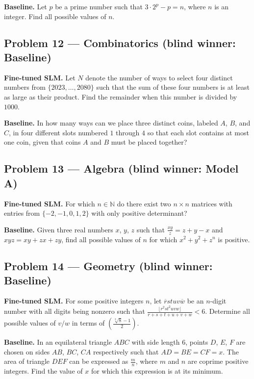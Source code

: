 \documentclass[11pt]{article}
\begin{document}
\medskip

\textbf{Baseline.} Let $p$ be a prime number such that $3 \cdot 2^p - p = n$, where $n$ is an integer. Find all possible values of $n$.

\subsection*{Problem 12 --- Combinatorics \quad (blind winner: Baseline)}

\textbf{Fine-tuned SLM.} Let $N$ denote the number of ways to select four distinct numbers from $\{2023,\dots,2080\}$ such that the sum of these four numbers is at least as large as their product. Find the remainder when this number is divided by $1000$.

\medskip

\textbf{Baseline.} In how many ways can we place three distinct coins, labeled $A$, $B$, and $C$, in four different slots numbered $1$ through $4$ so that each slot contains at most one coin, given that coins $A$ and $B$ must be placed together?

\subsection*{Problem 13 --- Algebra \quad (blind winner: Model A)}

\textbf{Fine-tuned SLM.} For which $n \in\mathbb{N}$ do there exist two $n\times n$ matrices with entries from $\{-2,-1,0,1,2\}$ with only positive determinant?

\medskip

\textbf{Baseline.} Given three real numbers $x$, $y$, $z$ such that $\frac{xy}{z} = z + y - x$ and $xyz = xy + zx + zy$, find all possible values of $n$ for which $x^{2} + y^2 + z^n$ is positive.

\subsection*{Problem 14 --- Geometry \quad (blind winner: Baseline)}

\textbf{Fine-tuned SLM.} For some positive integers $n$, let $\overline{r} s t u v \overline{w}$ be an $n$-digit number with all digits being nonzero such that $\frac{\lfloor r^{2} s t^{2} u v w\rfloor}{r+s+t+u+v+w}<6$. Determine all possible values of $v/w$ in terms of $(\frac{\sqrt[3]{8}-1}{2})$.

\medskip

\textbf{Baseline.} In an equilateral triangle $ABC$ with side length 6, points $D$, $E$, $F$ are chosen on sides $AB$, $BC$, $CA$ respectively such that $AD = BE = CF = x$. The area of triangle $DEF$ can be expressed as $\frac{m}{n}$, where $m$ and $n$ are coprime positive integers. Find the value of $x$ for which this expression is at its minimum.
\end{document}
